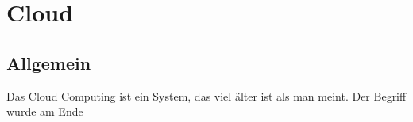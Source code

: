 \chapter{Cloud}
\section{Allgemein}
Das Cloud Computing ist ein System, das viel älter ist als man meint. Der Begriff wurde am Ende  